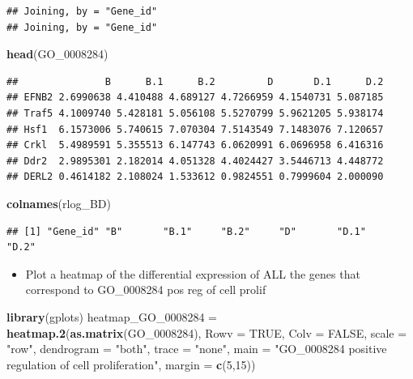 \documentclass[
]{article}
\newenvironment{Shaded}{\begin{snugshade}}{\end{snugshade}}
\newcommand{\DataTypeTok}[1]{\textcolor[rgb]{0.13,0.29,0.53}{#1}}
\newcommand{\DecValTok}[1]{\textcolor[rgb]{0.00,0.00,0.81}{#1}}
\newcommand{\KeywordTok}[1]{\textcolor[rgb]{0.13,0.29,0.53}{\textbf{#1}}}
\newcommand{\NormalTok}[1]{#1}
\newcommand{\OtherTok}[1]{\textcolor[rgb]{0.56,0.35,0.01}{#1}}
\newcommand{\StringTok}[1]{\textcolor[rgb]{0.31,0.60,0.02}{#1}}
\providecommand{\tightlist}{%
  \setlength{\itemsep}{0pt}\setlength{\parskip}{0pt}}
\begin{document}
\begin{verbatim}
## Joining, by = "Gene_id"
## Joining, by = "Gene_id"
\end{verbatim}

\begin{Shaded}
\begin{Highlighting}[]
\KeywordTok{head}\NormalTok{(GO_}\DecValTok{0008284}\NormalTok{)}
\end{Highlighting}
\end{Shaded}

\begin{verbatim}
##               B      B.1      B.2         D       D.1      D.2
## EFNB2 2.6990638 4.410488 4.689127 4.7266959 4.1540731 5.087185
## Traf5 4.1009740 5.428181 5.056108 5.5270799 5.9621205 5.938174
## Hsf1  6.1573006 5.740615 7.070304 7.5143549 7.1483076 7.120657
## Crkl  5.4989591 5.355513 6.147743 6.0620991 6.0696958 6.416316
## Ddr2  2.9895301 2.182014 4.051328 4.4024427 3.5446713 4.448772
## DERL2 0.4614182 2.108024 1.533612 0.9824551 0.7999604 2.000090
\end{verbatim}

\begin{Shaded}
\begin{Highlighting}[]
\KeywordTok{colnames}\NormalTok{(rlog_BD)}
\end{Highlighting}
\end{Shaded}

\begin{verbatim}
## [1] "Gene_id" "B"       "B.1"     "B.2"     "D"       "D.1"     "D.2"
\end{verbatim}

\begin{itemize}
\tightlist
\item
  Plot a heatmap of the differential expression of ALL the genes that
  correspond to GO\_0008284 pos reg of cell prolif
\end{itemize}

\begin{Shaded}
\begin{Highlighting}[]
\KeywordTok{library}\NormalTok{(gplots)}
\NormalTok{heatmap_GO_}\DecValTok{0008284}\NormalTok{ =}\StringTok{ }\KeywordTok{heatmap.2}\NormalTok{(}\KeywordTok{as.matrix}\NormalTok{(GO_}\DecValTok{0008284}\NormalTok{), }\DataTypeTok{Rowv =} \OtherTok{TRUE}\NormalTok{, }\DataTypeTok{Colv =} \OtherTok{FALSE}\NormalTok{, }\DataTypeTok{scale =} \StringTok{"row"}\NormalTok{,}
          \DataTypeTok{dendrogram =} \StringTok{"both"}\NormalTok{,}
          \DataTypeTok{trace =} \StringTok{"none"}\NormalTok{,}
          \DataTypeTok{main =} \StringTok{"GO_0008284 positive regulation of cell proliferation"}\NormalTok{,}
          \DataTypeTok{margin =} \KeywordTok{c}\NormalTok{(}\DecValTok{5}\NormalTok{,}\DecValTok{15}\NormalTok{))}
\end{Highlighting}
\end{Shaded}
\end{document}
